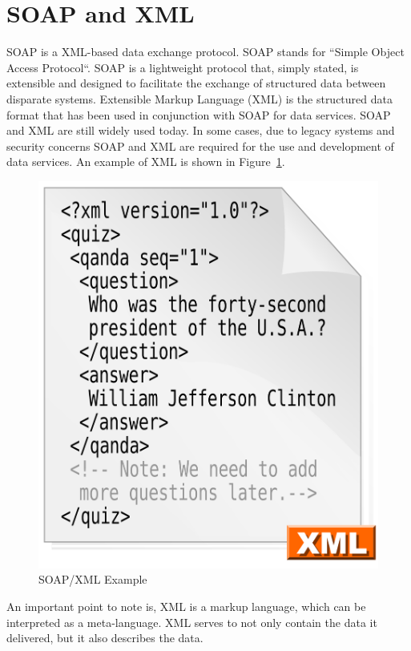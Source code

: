 \section{SOAP and XML}
SOAP is a XML-based data exchange protocol\cite{hid505Quaine2007}.  SOAP stands for
``Simple Object Access Protocol``\cite{hid505Microsoft2018}.  SOAP is a lightweight
protocol that, simply stated, is extensible and designed to facilitate the
exchange of structured data between disparate systems\cite{hid505Microsoft2018}.
Extensible Markup Language (XML) is the structured data format that has been
used in conjunction with SOAP for data services\cite{hid505Walsh1998}.  SOAP and XML
are still widely used today.  In some cases, due to legacy systems and security
concerns SOAP and XML are required for the use and development of data services.
An example of XML is shown in Figure~\ref{f:xml-example}\cite{hid505WikipidiaXML1028}.
\begin{figure}[!ht]
  \centering\includegraphics[width=\columnwidth]{images/xml-example.png}
  \caption{SOAP/XML Example}\label{f:xml-example}
\end{figure}
An important point to note is, XML is a markup language, which can be
interpreted as a meta-language.  XML serves to not only contain the data it
delivered, but it also describes the data\cite{hid505Aihkisalo2012}.

